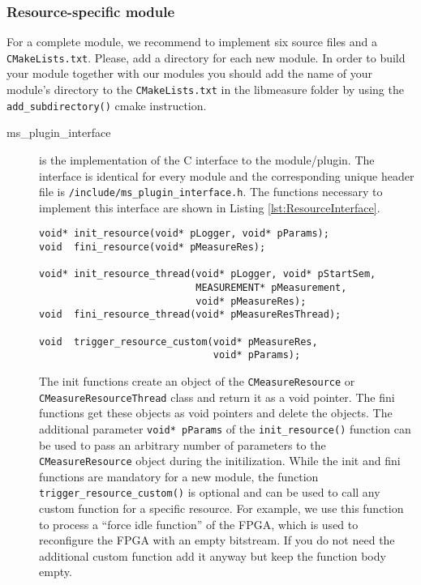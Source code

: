 \subsubsection{Resource-specific module}
For a complete module, we recommend to implement six source files and a \texttt{CMakeLists.txt}. Please, add a directory for each new module. In order to build your module together with our modules you should add the name of your module's directory to the \texttt{CMakeLists.txt} in the libmeasure folder by using the \texttt{add\_subdirectory()} cmake instruction.
\begin{description}
	\item[ms\_plugin\_interface] is the implementation of the C interface to the module/plugin. The interface is identical for every module and the corresponding unique header file is \texttt{/include/ms\_plugin\_interface.h}. The functions necessary to implement this interface are shown in Listing \ref{lst:ResourceInterface}.
	
	\begin{lstlisting}[caption={Interface that each plugin must implement.\added[id=ck]{Listing aktualisiert.}}, label=lst:ResourceInterface]
void* init_resource(void* pLogger, void* pParams);
void  fini_resource(void* pMeasureRes);

void* init_resource_thread(void* pLogger, void* pStartSem,
						   MEASUREMENT* pMeasurement,
						   void* pMeasureRes);
void  fini_resource_thread(void* pMeasureResThread);

void  trigger_resource_custom(void* pMeasureRes,
							  void* pParams);
	\end{lstlisting}
	The init functions create an object of the \texttt{CMeasureResource} or \\ \texttt{CMeasureResourceThread} class and return it as a void pointer. The fini functions get these objects as void pointers and delete the objects.
	The additional parameter \texttt{void* pParams} of the \texttt{init\_resource()} function can be used to pass an arbitrary number of parameters to the \\\texttt{CMeasureResource} object during the initilization. While the init and fini functions are mandatory for a new module, the function \texttt{trigger\_resource\_custom()} is optional and can be used to call any custom function for a specific resource. For example, we use this function to process a ``force idle function'' of the FPGA, which is used to reconfigure the FPGA with an empty bitstream.  If you do not need the additional custom function add it anyway but keep the function body empty.
	

\end{description}
